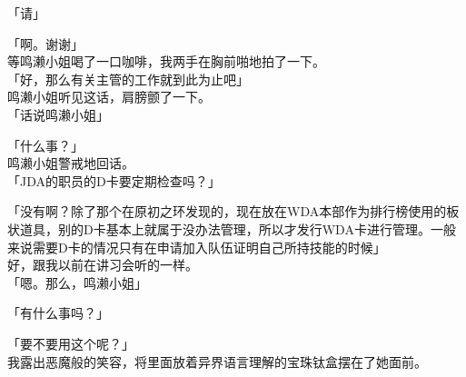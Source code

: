 「请」

「啊。谢谢」\\

等鸣濑小姐喝了一口咖啡，我两手在胸前啪地拍了一下。\\

「好，那么有关主管的工作就到此为止吧」\\

鸣濑小姐听见这话，肩膀颤了一下。\\

「话说鸣濑小姐」

「什么事？」\\

鸣濑小姐警戒地回话。\\

「JDA的职员的D卡要定期检查吗？」

「没有啊？除了那个在原初之环发现的，现在放在WDA本部作为排行榜使用的板状道具，别的D卡基本上就属于没办法管理，所以才发行WDA卡进行管理。一般来说需要D卡的情况只有在申请加入队伍证明自己所持技能的时候」\\

好，跟我以前在讲习会听的一样。\\

「嗯。那么，鸣濑小姐」

「有什么事吗？」

「要不要用这个呢？」\\

我露出恶魔般的笑容，将里面放着异界语言理解的宝珠钛盒摆在了她面前。\\

